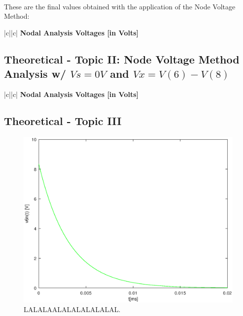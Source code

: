\paragraph{}
These are the final values obtained with the application of the Node Voltage Method:

\begin{center}
   \begin{tabular}{|c||c|}
      \hline    
       {\bf Nodal Analysis Voltages [in Volts]} \\
      \hline
        
   \end{tabular}
 \end{center}


\subsection{Theoretical - Topic II: Node Voltage Method Analysis w/ $Vs=0V$ and $Vx=V(6)-V(8)$}
\label{subsec:second_topic}

\begin{center}
   \begin{tabular}{|c||c|}
      \hline    
       {\bf Nodal Analysis Voltages [in Volts]} \\
      \hline
        
   \end{tabular}
 \end{center}
 
 
\subsection{Theoretical - Topic III}
\label{subsec:third_topic}

\begin{figure}[h!] \centering
\includegraphics[width=0.8\linewidth]{natural.eps}
\caption{LALALAALALALALALALAL.}
\label{fig:LALALAAL}
\end{figure}


